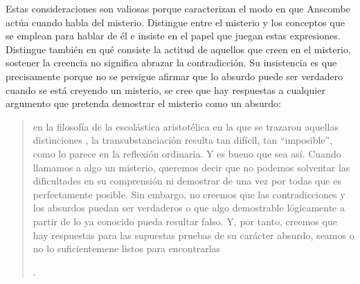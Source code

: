 Estas consideraciones son valiosas porque caracterizan el modo en que Anscombe actúa cuando habla del misterio. Distingue entre el misterio y los conceptos que se emplean para hablar de él e insiste en el papel que juegan estas expresiones. Distingue también en qué consiste la actitud de aquellos que creen en el misterio, sostener la creencia no significa abrazar la contradicción. Su insistencia es que precisamente porque no se persigue afirmar que lo absurdo puede ser verdadero cuando se está creyendo un misterio, se cree que hay respuestas a cualquier argumento que pretenda demostrar el misterio como un absurdo: \blockquote[{\Cite[88-89]{torralbaynubiola2005fayeh:ot}}.
]{en la filosofía de la escolástica aristotélica en la que se trazaron aquellas distinciones , la transubstanciación resulta tan difícil, tan ``imposible'', como lo parece en la reflexión ordinaria. Y es bueno que sea así. Cuando llamamos a algo un misterio, queremos decir que no podemos solventar las dificultades en su comprensión ni demostrar de una vez por todas que es perfectamente posible. Sin embargo, no creemos que las contradicciones y los absurdos puedan ser verdaderos o que algo demostrable lógicamente a partir de lo ya conocido pueda resultar falso. Y, por tanto, creemos que hay respuestas para las supuestas pruebas de su carácter absurdo, seamos o no lo suficientemene listos para encontrarlas}.

